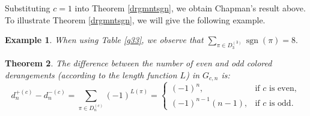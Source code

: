 \documentclass[a4paper,12pt]{article}
\newtheorem{thm}{Theorem}[section]
\newtheorem{lem}[thm]{Lemma}
\newtheorem{ex}[thm]{Example}
\begin{document}
Substituting $c=1$ into Theorem \ref{drgmntsgn}, we obtain Chapman's result above. To illustrate Theorem \ref{drgmntsgn}, we will give the following example.

\begin{ex}
When using Table \ref{g33}, we observe that $\sum_{\pi \in D_3^{(3)}} \operatorname{sgn}(\pi)=8.$
\end{ex}




\begin{thm}\label{thm:signed-strong-derangements}
The difference between the number of even and odd colored derangements (according to the length function $L$) in $G_{c,n}$ is:
\[
d_{n}^{+(c)}-d_{n}^{-(c)}=\sum_{\pi\in D_n^{(c)}} (-1)^{L(\pi)}
=
\begin{cases}
(-1)^{n}, & \text{if $c$ is even},\\[4pt]
(-1)^{n-1}(n-1), & \text{if $c$ is odd}.
\end{cases}
\]
\end{thm}
\end{document}

